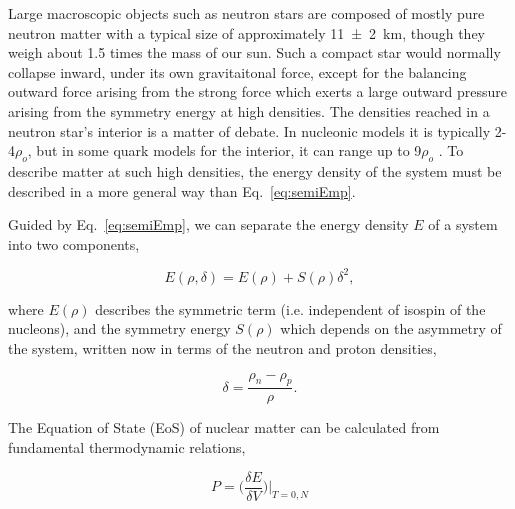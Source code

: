 Large macroscopic objects such as neutron stars are composed of mostly pure neutron matter \cite{neutronstar} with a typical size of approximately \SI{11(2)}{\kilo\metre}, though they weigh about 1.5 times the mass of our sun. Such a compact star would normally collapse inward, under its own gravitaitonal force, except for the balancing outward force arising from the strong force which exerts a large outward pressure arising from the symmetry energy at high densities.  The densities reached in a neutron star's interior is a matter of debate. In nucleonic models it is typically 2-4$\rho_o$, but in some quark models for the interior, it can range up to  9$\rho_o$ \cite{neutronstar}. To describe matter at such high densities, the energy density of the system must be described in a more general way than Eq.~\ref{eq:semiEmp}.




Guided by Eq.~\ref{eq:semiEmp}, we can separate the energy density $E$ of a system into two components,

\begin{equation}
E(\rho,\delta) = E(\rho	) + S(\rho)\delta^2,
\label{eq:energyEos}
\end{equation}

where $E(\rho)$ describes the symmetric term (i.e. independent of isospin of the nucleons), and the symmetry energy $S(\rho)$ which depends on the asymmetry of the system, written now in terms of the neutron and proton densities, 

\begin{equation}
\delta = \frac{\rho_n - \rho_p}{\rho}.
\label{eq:asym}
\end{equation}

The Equation of State (EoS) of nuclear matter can be calculated from fundamental thermodynamic relations, 

\begin{equation}
P = \Big(\frac{\delta E}{\delta V}\Big)\vert_{T=0,N}
\label{eq:pressEos}
\end{equation}

